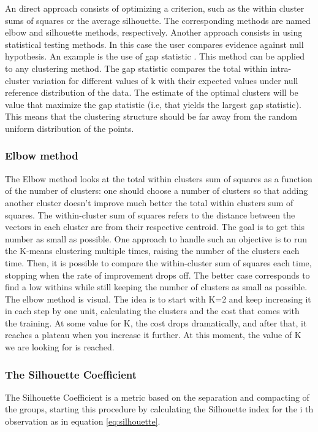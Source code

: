 An direct approach consists of optimizing a criterion, such as the within cluster sums of squares or the average silhouette. The corresponding methods are named elbow and silhouette methods, respectively. Another approach     consists in using statistical testing methods. In this case the user  compares evidence against null hypothesis. An example is the use of gap statistic \cite{theGapStatistic}. 
This method  can be applied to any clustering method.
The gap statistic compares the total within intra-cluster variation for different values of k with their expected values under null reference distribution of the data. The estimate of the optimal clusters will be value that maximize the gap statistic (i.e, that yields the largest gap statistic). This means that the clustering structure should be far away from the random uniform distribution of the points.


\subsubsection{Elbow method}
\label{subsub:elbow_method}
The Elbow method \cite{Kodinariya2013ReviewOD} looks at the total within clusters sum of squares as a function of the number of clusters: one should choose a number of clusters so that adding another cluster doesn't improve much better the total within clusters sum of squares.
The within-cluster sum of squares refers to the distance between the vectors in each cluster are from their respective centroid. The goal is to get this number as small as possible. One approach to handle such an objective is to run the K-means clustering multiple times, raising the number of the clusters each time. Then, it is possible to compare the within-cluster sum of squares each time, stopping when the rate of improvement drops off. The better case corresponds to find a low withins while still keeping the number of clusters as small as possible.\\

The elbow method is visual. The idea is to start with K=2 and keep increasing it in each step by one unit, calculating the clusters and the cost that comes with the training. At some value for K, the cost drops dramatically, and after that, it reaches a plateau when you increase it further. At this moment, the value of K we are looking for is reached.

\subsubsection{The Silhouette Coefficient}
\label{subsub:silhouette}
The Silhouette Coefficient is a metric based on the separation and compacting of the groups, starting this procedure by calculating the Silhouette index for the i th observation as in equation \ref{eq:silhouette}.

